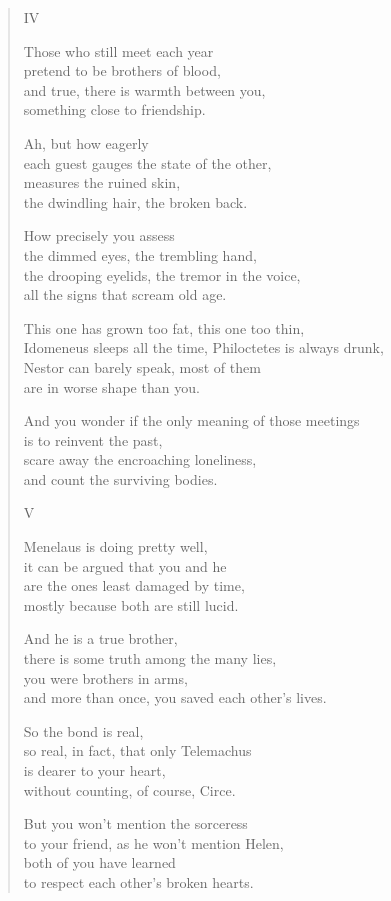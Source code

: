 \documentclass[11pt,a4paper]{article}
\begin{document}
\begin{verse}
IV

Those who still meet each year\\
pretend to be brothers of blood,\\
and true, there is warmth between you,\\
something close to friendship.

Ah, but how eagerly\\
each guest gauges the state of the other,\\
measures the ruined skin,\\
the dwindling hair, the broken back.

How precisely you assess\\
the dimmed eyes, the trembling hand,\\
the drooping eyelids, the tremor in the voice,\\
all the signs that scream old age.

This one has grown too fat, this one too thin,\\
Idomeneus sleeps all the time, Philoctetes is always drunk,\\
Nestor can barely speak, most of them\\
are in worse shape than you.

And you wonder if the only meaning of those meetings\\
is to reinvent the past,\\
scare away the encroaching loneliness,\\
and count the surviving bodies.

V

Menelaus is doing pretty well,\\
it can be argued that you and he\\
are the ones least damaged by time,\\
mostly because both are still lucid.

And he is a true brother,\\
there is some truth among the many lies,\\
you were brothers in arms,\\
and more than once, you saved each other's lives.

So the bond is real,\\
so real, in fact, that only Telemachus\\
is dearer to your heart,\\
without counting, of course, Circe.

But you won't mention the sorceress\\
to your friend, as he won't mention Helen,\\
both of you have learned\\
to respect each other's broken hearts.


\end{verse}
\end{document}
